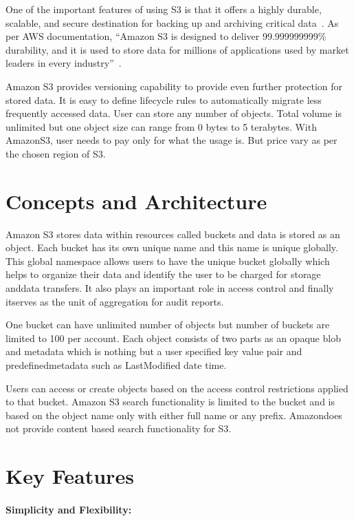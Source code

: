One of the important features of using S3 is that it offers a highly durable,
scalable, and secure destination for backing up and archiving critical
data~\cite{hid-sp18-420-amazon-S3}. As per AWS documentation, ``Amazon S3 is
designed to deliver 99.999999999\% durability, and it is used to store data for
millions of applications used by market leaders in every
industry''~\cite{hid-sp18-420-amazon-S3}.

Amazon S3 provides versioning capability to provide even further protection for
stored data. It is easy to define lifecycle rules to automatically migrate less
frequently accessed data. User can store any number of objects. Total volume is
unlimited but one object size can range from 0 bytes to 5 terabytes. With
AmazonS3, user needs to pay only for what the usage is. But price vary as per
the
chosen region of S3.



\section{Concepts and Architecture}

Amazon S3 stores data within resources called buckets and data is stored as an
object. Each bucket has its own unique name and this name is unique globally.
This global namespace allows users to have the unique bucket globally which
helps to organize their data and identify the user to be charged for storage
anddata transfers. It also plays an important role in access control and finally
itserves as the unit of aggregation for audit reports.


One bucket can have unlimited number of objects but number of buckets are
limited to 100 per account. Each object consists of two parts as an opaque blob
and metadata which is nothing but a user specified key value pair and
predefinedmetadata such as LastModified date time.

Users can access or create objects based on the access control restrictions
applied to that bucket. Amazon S3 search functionality is limited to the bucket
and is based on the object name only with either full name or any prefix.
Amazondoes not provide content based search functionality for S3.



\section{Key Features}

\paragraph{Simplicity and Flexibility:} 

